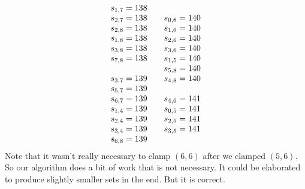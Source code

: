 \documentclass[letterpaper]{article} %
\theoremstyle{definition}
\begin{document}
\[\begin{array}[t]{lllll}
\begin{array}{l}
s_{1, 7} = 138 \\
s_{2, 7} = 138 \\
s_{2, 8} = 138 \\
s_{1, 8} = 138 \\
s_{3, 8} = 138 \\
s_{7, 8} = 138 \\
\\
s_{3, 7} = 139 \\
s_{5, 7} = 139 \\
s_{6, 7} = 139 \\
s_{1, 4} = 139 \\
s_{2, 4} = 139 \\
s_{3, 4} = 139 \\
s_{6, 8} = 139 \\
   \end{array}
 &
  \begin{array}{l}
s_{0, 6} = 140 \\
s_{1, 6} = 140 \\
s_{2, 6} = 140 \\
s_{3, 6} = 140 \\
s_{1, 5} = 140 \\
s_{5, 8} = 140 \\
s_{4, 8} = 140 \\
\\
s_{4, 6} = 141 \\
s_{0, 5} = 141 \\
s_{2, 5} = 141 \\
s_{3, 5} = 141 \\
\end{array}
\end{array}
\]
Note that it wasn't really necessary to clamp $(6,6)$ after we clamped $(5,6)$.
So our algorithm does a bit of work that is not necessary.   
It could be elaborated to produce slightly smaller sets in the end.  But it is correct.







%
\end{document}
